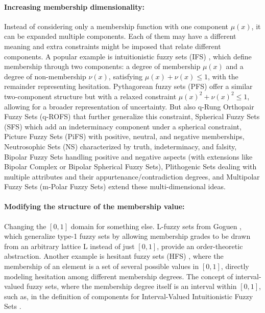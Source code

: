 \paragraph{Increasing membership dimensionality:} Instead of considering only a membership function with one component $\mu(x)$, it can be expanded multiple components. Each of them may have a different meaning and extra constraints might be imposed that relate different components. A popular example is intuitionistic fuzzy sets (IFS) \cite{Atanassov1986}, which define membership through two components: a degree of membership $\mu(x)$ and a degree of non-membership $\nu(x)$, satisfying $\mu(x) + \nu(x) \leq 1$, with the remainder representing hesitation. Pythagorean fuzzy sets (PFS) \cite{Yager2013_Pythagorean} offer a similar two-component structure but with a relaxed constraint $\mu(x)^2 + \nu(x)^2 \leq 1$, allowing for a broader representation of uncertainty. But also q-Rung Orthopair Fuzzy Sets (q-ROFS) \cite{Yager2017_qRung} that further generalize this constraint, Spherical Fuzzy Sets (SFS) \cite{GundogduKahraman2019_Spherical} which add an indeterminacy component under a spherical constraint, Picture Fuzzy Sets (PiFS) \cite{Cuong2013_Picture} with positive, neutral, and negative memberships, Neutrosophic Sets (NS) \cite{Smarandache1998_Neutrosophic, Wang2010_SVNS} characterized by truth, indeterminacy, and falsity, Bipolar Fuzzy Sets \cite{Zhang1994_Bipolar} handling positive and negative aspects (with extensions like Bipolar Complex or Bipolar Spherical Fuzzy Sets), Plithogenic Sets \cite{Smarandache2018_Plithogenic} dealing with multiple attributes and their appurtenance/contradiction degrees,  and Multipolar Fuzzy Sets (m-Polar Fuzzy Sets) \cite{Chen2014_mPolar} extend these multi-dimensional ideas.

\paragraph{Modifying the structure of the membership value:} Changing the $[0,1]$ domain for something else. L-fuzzy sets from Goguen \cite{Goguen1967}, which generalize type-1 fuzzy sets by allowing membership grades to be drawn from an arbitrary lattice L instead of just $[0,1]$, provide an order-theoretic abstraction. Another example is hesitant fuzzy sets (HFS) \cite{Torra2010}, where the membership of an element is a set of several possible values in $[0,1]$, directly modeling hesitation among different membership degrees. The concept of interval-valued fuzzy sets, where the membership degree itself is an interval within $[0,1]$, such as, in the definition of components for Interval-Valued Intuitionistic Fuzzy Sets \cite{AtanassovGargov1989}.

